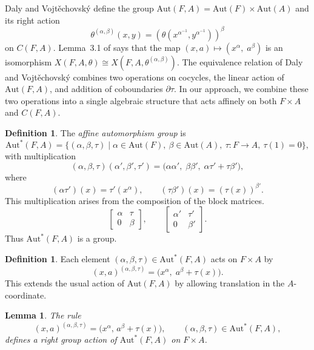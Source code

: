 \documentclass[12pt,a4paper]{amsart}
\newtheorem{lemma}[theorem]{Lemma}
\theoremstyle{definition}
\newtheorem{definition}[theorem]{Definition}
\begin{document}
Daly and Vojt\v{e}chovsk\'y \cite{DalyVojtechovsky2009} define the group $\mathrm{Aut}(F,A)=\mathrm{Aut}(F)\times\mathrm{Aut}(A)$ and its right action 
\[
\theta^{(\alpha,\beta)}(x,y)
=\left(\theta(x^{\alpha^{-1}},y^{\alpha^{-1}})\right)^\beta
\]
on $C(F,A)$. Lemma~3.1 of \cite{DalyVojtechovsky2009} says that the map $(x,a)\longmapsto (x^{\alpha},\; a^{\beta})$ is an isomorphism $X(F,A,\theta)\cong X(F,A,\theta^{(\alpha,\beta)})$. The equivalence relation of Daly and Vojt\v{e}chovsk\'y combines two operations on cocycles, the linear action of $\mathrm{Aut}(F, A)$, and addition of coboundaries $\partial{\tau}$. In our approach, we combine these two operations into a single algebraic structure that acts affinely on both $F\times A$ and $C(F, A)$.

\begin{definition}\label{def:1}
The \textit{affine automorphism group} is
\[
\mathrm{Aut}^{\!*}(F,A)
=
\bigl\{(\alpha,\beta,\tau)
\;\big|\;
\alpha\in\mathrm{Aut}(F),\ \beta\in\mathrm{Aut}(A),\ 
\tau:F\to A,\ \tau(1)=0\bigr\},
\]
with multiplication
\[
(\alpha,\beta,\tau)(\alpha',\beta',\tau')
=
\bigl(\alpha\alpha',\; \beta\beta',\; \alpha\tau' + \tau\beta'\bigr),
\]
where
\[
(\alpha\tau')(x)=\tau'(x^{\alpha}),\qquad
(\tau\beta')(x)=(\tau(x))^{\beta'}.
\]
This multiplication arises from the composition of the block matrices.
\[
\begin{bmatrix}
\alpha & \tau \\
0 & \beta
\end{bmatrix},
\qquad
\begin{bmatrix}
\alpha' & \tau' \\
0 & \beta'
\end{bmatrix}.
\]
Thus $\mathrm{Aut}^{\!*}(F,A)$ is a group.
\end{definition}

\begin{definition}\label{def:2}
Each element $(\alpha,\beta,\tau)\in\mathrm{Aut}^{\!*}(F,A)$ acts on $F\times A$ by
\[
(x,a)^{(\alpha,\beta,\tau)}
=
\bigl(x^{\alpha},\; a^{\beta} + \tau(x)\bigr).
\]
This extends the usual action of $\mathrm{Aut}(F, A)$ by allowing translation in the $A$-coordinate.
\end{definition}

\begin{lemma}
The rule
\[
(x,a)^{(\alpha,\beta,\tau)}
=
\bigl(x^{\alpha},\,a^{\beta}+\tau(x)\bigr),
\qquad
(\alpha,\beta,\tau)\in\mathrm{Aut}^{\!*}(F,A),
\]
defines a right group action of $\mathrm{Aut}^{\!*}(F,A)$ on $F\times A$.
\end{lemma}
\end{document}
